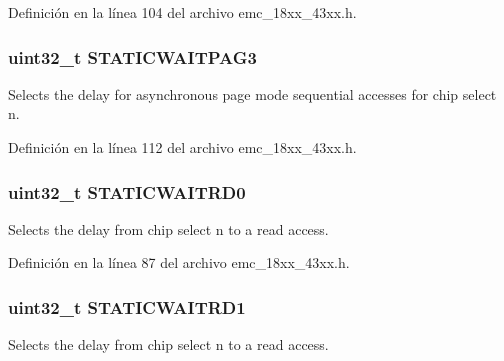 Definición en la línea 104 del archivo emc\+\_\+18xx\+\_\+43xx.\+h.

\subsubsection[{\texorpdfstring{S\+T\+A\+T\+I\+C\+W\+A\+I\+T\+P\+A\+G3}{STATICWAITPAG3}}]{ uint32\+\_\+t S\+T\+A\+T\+I\+C\+W\+A\+I\+T\+P\+A\+G3}\hypertarget{struct_l_p_c___e_m_c___t_af066c6eaa502e952bbdb8ae4ba81c42a}{}\label{struct_l_p_c___e_m_c___t_af066c6eaa502e952bbdb8ae4ba81c42a}
Selects the delay for asynchronous page mode sequential accesses for chip select n. 

Definición en la línea 112 del archivo emc\+\_\+18xx\+\_\+43xx.\+h.

\subsubsection[{\texorpdfstring{S\+T\+A\+T\+I\+C\+W\+A\+I\+T\+R\+D0}{STATICWAITRD0}}]{ uint32\+\_\+t S\+T\+A\+T\+I\+C\+W\+A\+I\+T\+R\+D0}\hypertarget{struct_l_p_c___e_m_c___t_a275acf7dfde1255af108f5e92655b342}{}\label{struct_l_p_c___e_m_c___t_a275acf7dfde1255af108f5e92655b342}
Selects the delay from chip select n to a read access. 

Definición en la línea 87 del archivo emc\+\_\+18xx\+\_\+43xx.\+h.

\subsubsection[{\texorpdfstring{S\+T\+A\+T\+I\+C\+W\+A\+I\+T\+R\+D1}{STATICWAITRD1}}]{ uint32\+\_\+t S\+T\+A\+T\+I\+C\+W\+A\+I\+T\+R\+D1}\hypertarget{struct_l_p_c___e_m_c___t_aed01e7c2c446f27f019a8034cd49dfce}{}\label{struct_l_p_c___e_m_c___t_aed01e7c2c446f27f019a8034cd49dfce}
Selects the delay from chip select n to a read access. 


